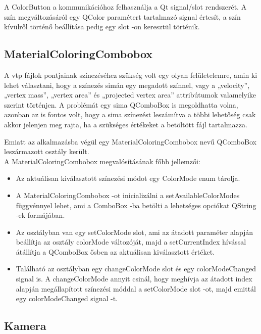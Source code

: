 A {\ttfamily ColorButton} a kommunikációhoz felhasználja a Qt signal/slot rendszerét. 
A szín megváltozásáról egy {\ttfamily QColor} paramétert tartalmazó signal értesít, 
a szín kívülről történő beállítása pedig egy slot -on keresztül történik.

\subsection{MaterialColoringCombobox}

A vtp fájlok pontjainak színezéséhez szükség volt egy olyan felületelemre, 
amin ki lehet választani, 
hogy a színezés simán egy megadott színnel, 
vagy a {\ttfamily „velocity”}, {\ttfamily „vertex mass”}, {\ttfamily „vertex area”} 
és {\ttfamily „projected vertex area”} attribútumok valamelyike szerint történjen. 
A problémát egy sima {\ttfamily QComboBox} is megoldhatta volna, 
azonban az is fontos volt, 
hogy a sima színezést leszámítva a többi lehetőség csak akkor jelenjen meg rajta, 
ha a szükséges értékeket a betöltött fájl tartalmazza.

Emiatt az alkalmazásba végül egy {\ttfamily MaterialColoringCombobox} nevű 
{\ttfamily QComboBox} leszármazott osztály került. 
\\
A {\ttfamily MaterialColoringCombobox} megvalósításának főbb jellemzői:
\begin{itemize}
\item
Az aktuálisan kiválasztott színezési módot egy {\ttfamily ColorMode} enum tárolja.
\item
A {\ttfamily MaterialColoringCombobox} -ot 
inicializálni a {\ttfamily setAvailableColorModes} függvénnyel lehet, 
ami a ComboBox -ba betölti 
a lehetséges opciókat {\ttfamily QString} -ek formájában.
\item
Az osztályban van egy {\ttfamily setColorMode} slot, 
ami az átadott paraméter alapján beállítja 
az osztály {\ttfamily colorMode} változóját, 
majd a {\ttfamily setCurrentIndex} hívással átállítja 
a {\ttfamily QComboBox} ősben az aktuálisan kiválasztott értéket.
\item
Található az osztályban egy {\ttfamily changeColorMode} slot 
és egy {\ttfamily colorModeChanged} signal is. 
A {\ttfamily changeColorMode} annyit csinál, 
hogy meghívja az átadott index alapján megállapított színezési móddal 
a {\ttfamily setColorMode} slot -ot, 
majd emittál egy {\ttfamily colorModeChanged} signal -t.
\end{itemize}

\subsection{Kamera}

